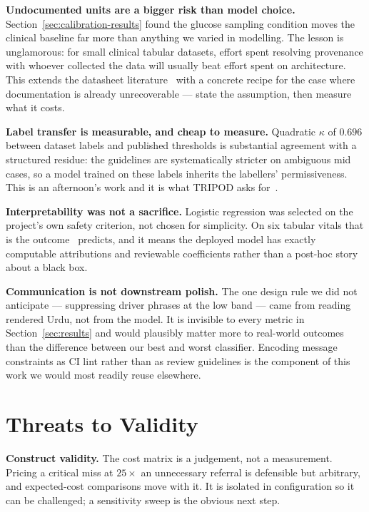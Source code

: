 \documentclass[journal]{IEEEtran}
\begin{document}
\textbf{Undocumented units are a bigger risk than model choice.}
Section~\ref{sec:calibration-results} found the glucose sampling condition moves
the clinical baseline far more than anything we varied in modelling. The lesson
is unglamorous: for small clinical tabular datasets, effort spent resolving
provenance with whoever collected the data will usually beat effort spent on
architecture. This extends the datasheet literature~\cite{gebru2021datasheets}
with a concrete recipe for the case where documentation is already unrecoverable
--- state the assumption, then measure what it costs.

\textbf{Label transfer is measurable, and cheap to measure.} Quadratic $\kappa$
of $0.696$ between dataset labels and published thresholds is substantial
agreement with a structured residue: the guidelines are systematically stricter
on ambiguous mid cases, so a model trained on these labels inherits the
labellers' permissiveness. This is an afternoon's work and it is what TRIPOD
asks for~\cite{tripod2015}.

\textbf{Interpretability was not a sacrifice.} Logistic regression was selected
on the project's own safety criterion, not chosen for simplicity. On six tabular
vitals that is the outcome~\cite{rudin2019stop} predicts, and it means the
deployed model has exactly computable attributions and reviewable coefficients
rather than a post-hoc story about a black box.

\textbf{Communication is not downstream polish.} The one design rule we did not
anticipate --- suppressing driver phrases at the low band --- came from reading
rendered Urdu, not from the model. It is invisible to every metric in
Section~\ref{sec:results} and would plausibly matter more to real-world outcomes
than the difference between our best and worst classifier. Encoding message
constraints as CI lint rather than as review guidelines is the component of this
work we would most readily reuse elsewhere.

\section{Threats to Validity}

\textbf{Construct validity.} The cost matrix is a judgement, not a measurement.
Pricing a critical miss at $25\times$ an unnecessary referral is defensible but
arbitrary, and expected-cost comparisons move with it. It is isolated in
configuration so it can be challenged; a sensitivity sweep is the obvious next
step.
\end{document}
